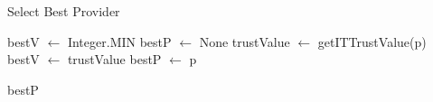 
\begin{algorithm}[H]
\caption{Select Best Provider}
\begin{algorithmic}

\STATE bestV $\leftarrow$ Integer.MIN
\STATE bestP $\leftarrow$ None
\STATE trustValue $\leftarrow$ getITTrustValue(p)
\STATE bestV $\leftarrow$ trustValue
\STATE bestP $\leftarrow$ p
\ENDIF
\ENDFOR

\RETURN bestP
\end{algorithmic} 
\end{algorithm}
